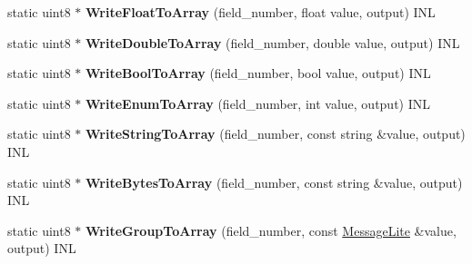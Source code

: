 \begin{DoxyCompactItemize}
\item 
\mbox{\label{classgoogle_1_1protobuf_1_1internal_1_1WireFormatLite_a98098cfdb51c5063850b82ed41916170}} 
static uint8 $\ast$ {\bfseries Write\+Float\+To\+Array} (field\+\_\+number, float value, output) I\+NL
\item 
\mbox{\label{classgoogle_1_1protobuf_1_1internal_1_1WireFormatLite_a59ea08692608bf8c1c12b422a33ab988}} 
static uint8 $\ast$ {\bfseries Write\+Double\+To\+Array} (field\+\_\+number, double value, output) I\+NL
\item 
\mbox{\label{classgoogle_1_1protobuf_1_1internal_1_1WireFormatLite_a8c274cfbfa082b779055046f77204838}} 
static uint8 $\ast$ {\bfseries Write\+Bool\+To\+Array} (field\+\_\+number, bool value, output) I\+NL
\item 
\mbox{\label{classgoogle_1_1protobuf_1_1internal_1_1WireFormatLite_ae4cf72e5389e405fe0e636b3d23a46a0}} 
static uint8 $\ast$ {\bfseries Write\+Enum\+To\+Array} (field\+\_\+number, int value, output) I\+NL
\item 
\mbox{\label{classgoogle_1_1protobuf_1_1internal_1_1WireFormatLite_ac9d2dd4b78f1573537716fc56161c63d}} 
static uint8 $\ast$ {\bfseries Write\+String\+To\+Array} (field\+\_\+number, const string \&value, output) I\+NL
\item 
\mbox{\label{classgoogle_1_1protobuf_1_1internal_1_1WireFormatLite_ae21cba6f72439d21f07af6cc8226894b}} 
static uint8 $\ast$ {\bfseries Write\+Bytes\+To\+Array} (field\+\_\+number, const string \&value, output) I\+NL
\item 
\mbox{\label{classgoogle_1_1protobuf_1_1internal_1_1WireFormatLite_a521de3eb58c8c5079f1f863af508043b}} 
static uint8 $\ast$ {\bfseries Write\+Group\+To\+Array} (field\+\_\+number, const \hyperlink{classgoogle_1_1protobuf_1_1MessageLite}{Message\+Lite} \&value, output) I\+NL
\item 

\end{DoxyCompactItemize}
